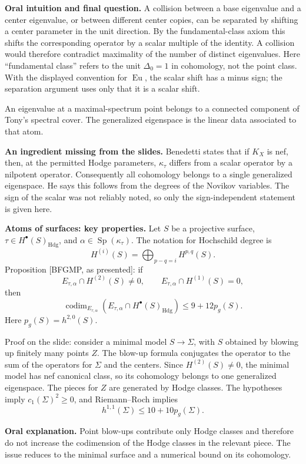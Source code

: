 \textbf{Oral intuition and final question.}
A collision between a base eigenvalue and
a center eigenvalue, or between different
center copies, can be separated by shifting
a center parameter in the unit direction.
By the fundamental-class axiom this shifts
the corresponding operator by a scalar
multiple of the identity. A collision
would therefore contradict maximality of
the number of distinct eigenvalues.
Here ``fundamental class'' refers to the
unit $\Delta_0=1$ in cohomology, not the
point class. With the displayed convention
for $\operatorname{Eu}$, the scalar shift
has a minus sign; the separation argument
uses only that it is a scalar shift.

An eigenvalue at a maximal-spectrum point
belongs to a connected component of Tony's
spectral cover. The generalized eigenspace
is the linear data associated to that atom.

\medskip\noindent
\textbf{An ingredient missing from the
slides.}
Benedetti states that if $K_X$ is nef,
then, at the permitted Hodge parameters,
$\kappa_\tau$ differs from a scalar operator
by a nilpotent operator. Consequently all
cohomology belongs to a single generalized
eigenspace. He says this follows from the
degrees of the Novikov variables.
The sign of the scalar was not
reliably noted, so only the sign-independent
statement is given here.

\medskip\noindent
\textbf{Atoms of surfaces: key properties.}
Let $S$ be a projective surface,
$\tau\in H^\bullet(S)_{\mathrm{Hdg}}$, and
$\alpha\in\operatorname{Sp}(\kappa_\tau)$.
The notation for Hochschild degree is
$$
H^{(i)}(S)=\bigoplus_{p-q=i}H^{p,q}(S).
$$
Proposition [BFGMP, as presented]: if
$$
E_{\tau,\alpha}\cap H^{(2)}(S)\neq0,
\qquad
E_{\tau,\alpha}\cap H^{(1)}(S)=0,
$$
then
$$
\operatorname{codim}_{E_{\tau,\alpha}}
(E_{\tau,\alpha}\cap
H^\bullet(S)_{\mathrm{Hdg}})
\leq9+12p_g(S).
$$
Here $p_g(S)=h^{2,0}(S)$.

Proof on the slide: consider a minimal
model $S\to\Sigma$, with $S$ obtained by
blowing up finitely many points $Z$.
The blow-up formula conjugates the operator
to the sum of the operators for $\Sigma$
and the centers. Since
$H^{(2)}(S)\neq0$, the minimal model has
nef canonical class, so its cohomology
belongs to one generalized eigenspace.
The pieces for $Z$ are generated by Hodge
classes. The hypotheses imply
$c_1(\Sigma)^2\geq0$, and Riemann--Roch
implies
$$
h^{1,1}(\Sigma)\leq10+10p_g(\Sigma).
$$

\textbf{Oral explanation.}
Point blow-ups contribute only Hodge
classes and therefore do not increase the
codimension of the Hodge classes in the
relevant piece. The issue reduces to the
minimal surface and a numerical bound on
its cohomology.

